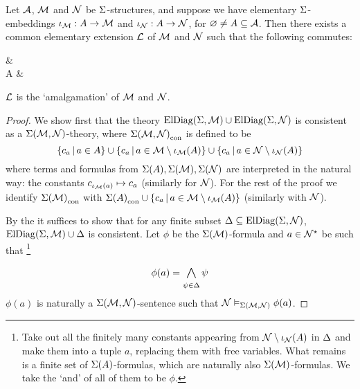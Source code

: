 \begin{cor}[Amalgamation]
    Let $\AA$, $\MM$ and $\NN$ be $\Si$-structures,
    and suppose we have  
    elementary $\Si$-embeddings
    $\io_\MM : A \to \MM$ and 
    $\io_\NN : A \to \NN$, for $\nothing \ne A \subs \AA$.
    Then there exists a common elementary extension $\LL$ of $\MM$ and $\NN$
    such that the following commutes:
    \begin{cd}
        \MM \ar[r] &\LL \\
        A \ar[u, "\io_\MM"] \ar[r, "\io_\NN"] &\NN \ar[u]
    \end{cd}
    $\LL$ is the `amalgamation' of $\MM$ and $\NN$.
\end{cor}
\begin{proof}
    We show first that the theory $\eldiag{\Si}{\MM} \cup \eldiag{\Si}{\NN}$
    is consistent as a $\Si(\MM,\NN)$-theory, where $\const{\Si(\MM,\NN)}$ is 
    defined to be 
    \[
        \set{c_a \st a \in A} \cup 
        \set{c_a \st a \in \MM \setminus \io_\MM(A)}
        \cup \set{c_a \st a \in \NN \setminus \io_\NN(A)}
    \]
    where terms and formulas from $\Si(A), \Si(\MM), \Si(\NN)$ 
    are interpreted in the natural way: 
    the constants $c_{\io_\MM(a)} \mapsto c_a$ (similarly for $\NN$).
    For the rest of the proof we identify 
    $\const{\Si(\MM)}$ with
    $\const{\Si(A)} \cup \set{c_a \st a \in \MM \setminus \io_\MM(A)}$
    (similarly with $\NN$). 

    By the  it suffices to show that 
    for any finite subset $\De \subs \eldiag{\Si}{\NN}$,
    $\eldiag{\Si}{\MM} \cup \De$ is consistent.
    Let $\phi$ be the $\Si(\MM)$-formula and $a \in \NN^\star$ be such 
    that \footnote{Take out all the finitely many constants appearing from 
        $\NN \setminus \io_{\NN}(A)$ in 
        $\De$ and make them into a tuple $a$, 
        replacing them with free variables.
        What remains is a finite set of $\Si(A)$-formulas, 
        which are naturally also $\Si(\MM)$-formulas. 
        We take the `and' of all of them to be $\phi$.}
    \[\phi(a) = \bigand{\psi \in \De}{} \psi\]
    $\phi(a)$ is naturally a $\Si(\MM,\NN)$-sentence such that 
    $\NN \model{\Si(\MM,\NN)} \phi(a)$.
    

\end{proof}
